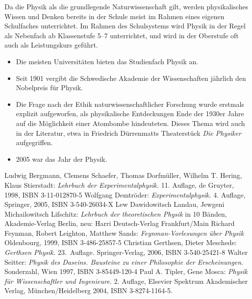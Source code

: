 \documentclass[titlepage, parkskip=full, twocolumn, landscape]{scrartcl}
\begin{document}
Da die Physik als die grundlegende Naturwissenschaft gilt, werden physikalisches Wissen und Denken bereits in der Schule meist im Rahmen eines eigenen Schulfaches unterrichtet. Im Rahmen des Schulsystems wird Physik in der Regel als Nebenfach ab Klassenstufe 5--7 unterrichtet, und wird in der Oberstufe oft auch als Leistungskurs geführt.
\begin{itemize}
	\item Die meisten Universitäten bieten das Studienfach Physik an.
	\item Seit 1901 vergibt die Schwedische Akademie der Wissenschaften jährlich den Nobelpreis für Physik.
	\item Die Frage nach der Ethik naturwissenschaftlicher Forschung wurde erstmals explizit aufgeworfen, als physikalische Entdeckungen Ende der 1930er Jahre auf die Möglichkeit einer Atombombe hindeuteten. Dieses Thema wird auch in der Literatur, etwa in Friedrich Dürrenmatts Theaterstück \emph{Die Physiker} aufgegriffen.
	\item 2005 war das Jahr der Physik.
\end{itemize}

\begin{thebibliography}{7}
	 Ludwig Bergmann, Clemens Schaefer, Thomas Dorfmüller, Wilhelm T. Hering, Klaus Stierstadt: \emph{Lehrbuch der Experimentalphysik.} 11. Auflage, de Gruyter, 1998, ISBN 3-11-012870-5
	 Wolfgang Demtröder: \emph{Experimentalphysik.} 4. Auflage, Springer, 2005, ISBN 3-540-26034-X
	 Lew Dawidowitsch Landau, Jewgeni Michailowitsch Lifschitz: \emph{Lehrbuch der theoretischen Physik} in 10 Bänden, Akademie-Verlag Berlin, neu: Harri Deutsch-Verlag Frankfurt/Main
	 Richard Feynman, Robert Leighton, Matthew Sands: \emph{Feynman-Vorlesungen über Physik} Oldenbourg, 1999, ISBN 3-486-25857-5
	 Christian Gerthsen, Dieter Meschede: \emph{Gerthsen Physik.} 23.~Auflage. Springer-Verlag, 2006, ISBN 3-540-25421-8
	 Walter Seitter: \emph{Physik des Daseins. Bausteine zu einer Philosophie der Erscheinungen}. Sonderzahl, Wien 1997, ISBN 3-85449-120-4
	 Paul A. Tipler, Gene Mosca: \emph{Physik für Wissenschaftler und Ingenieure.} 2. Auflage, Elsevier Spektrum Akademischer Verlag, München/Heidelberg 2004, ISBN 3-8274-1164-5.
\end{thebibliography}
\end{document}
